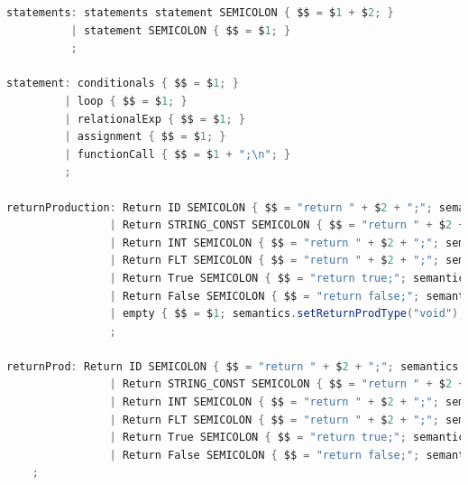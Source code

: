 \documentclass[12pt]{report}
\begin{document}
\begin{singlespace}
\begin{lstlisting}[language=Java,label=some-code,caption={flood$\_$grammar.y}]
statements: statements statement SEMICOLON { $$ = $1 + $2; }
          | statement SEMICOLON { $$ = $1; }
          ;

statement: conditionals { $$ = $1; }
         | loop { $$ = $1; }
         | relationalExp { $$ = $1; }
         | assignment { $$ = $1; }
         | functionCall { $$ = $1 + ";\n"; }
         ;

returnProduction: Return ID SEMICOLON { $$ = "return " + $2 + ";"; semantics.setReturnProdType(semantics.getType($2)); }
                | Return STRING_CONST SEMICOLON { $$ = "return " + $2 + ";"; semantics.setReturnProdType("String"); }
                | Return INT SEMICOLON { $$ = "return " + $2 + ";"; semantics.setReturnProdType("int"); }
                | Return FLT SEMICOLON { $$ = "return " + $2 + ";"; semantics.setReturnProdType("float"); }
                | Return True SEMICOLON { $$ = "return true;"; semantics.setReturnProdType("boolean"); }
                | Return False SEMICOLON { $$ = "return false;"; semantics.setReturnProdType("boolean"); }
                | empty { $$ = $1; semantics.setReturnProdType("void"); }
                ;

returnProd: Return ID SEMICOLON { $$ = "return " + $2 + ";"; semantics.setReturnProdType(semantics.getType($2)); }
                | Return STRING_CONST SEMICOLON { $$ = "return " + $2 + ";"; semantics.setReturnProdType("String"); }
                | Return INT SEMICOLON { $$ = "return " + $2 + ";"; semantics.setReturnProdType("int"); }
                | Return FLT SEMICOLON { $$ = "return " + $2 + ";"; semantics.setReturnProdType("float"); }
                | Return True SEMICOLON { $$ = "return true;"; semantics.setReturnProdType("boolean"); }
                | Return False SEMICOLON { $$ = "return false;"; semantics.setReturnProdType("boolean"); }
    ;


\end{lstlisting}
\end{singlespace}
\end{document}
